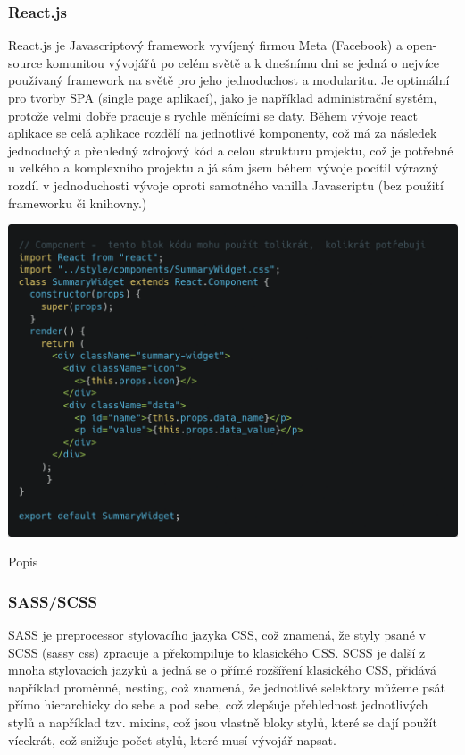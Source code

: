 \documentclass[12pt,a4paper]{report}
\begin{document}
  \subsubsection{React.js}
  React.js je Javascriptový framework vyvíjený firmou Meta (Facebook) a open-source komunitou
  vývojářů po celém světě a k dnešnímu dni se jedná o nejvíce používaný framework na světě pro
  jeho jednoduchost a modularitu.
  Je optimální pro tvorby SPA (single page aplikací), jako je například administrační systém, protože
  velmi dobře pracuje s rychle měnícími se daty. Během vývoje react aplikace se celá aplikace
  rozdělí na jednotlivé komponenty, což má za následek jednoduchý a přehledný zdrojový kód a
  celou strukturu projektu, což je potřebné u velkého a komplexního projektu a já sám jsem během
  vývoje pocítil výrazný rozdíl v jednoduchosti vývoje oproti samotného vanilla Javascriptu (bez
  použití frameworku či knihovny.)

  \vspace*{0.5cm}
  \noindent\includegraphics[width=\linewidth]{reactCodeblock.png}
  \begin{center}
    Popis
  \end{center}
  \vspace*{0.5cm}

  \subsubsection{SASS/SCSS}
  SASS je preprocessor stylovacího jazyka CSS, což znamená, že styly psané v SCSS (sassy css)
  zpracuje a překompiluje to klasického CSS.
  SCSS je další z mnoha stylovacích jazyků a jedná se o přímé rozšíření klasického CSS, přidává
  například proměnné, nesting, což znamená, že jednotlivé selektory můžeme psát přímo
  hierarchicky do sebe a pod sebe, což zlepšuje přehlednost jednotlivých stylů a například tzv.
  mixins, což jsou vlastně bloky stylů, které se dají použít vícekrát, což snižuje počet stylů, které musí
  vývojář napsat.
  
\end{document}
